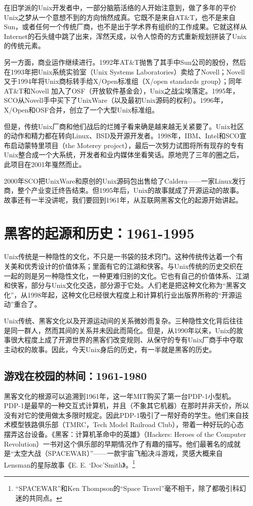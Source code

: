 \documentclass[12pt,oneside]{book}
\begin{document}
在旧学派的Unix开发者中，一部分脑筋活络的人开始注意到，做了多年的平价Unix之梦从一个意想不到的方向悄然成真。它既不是来自AT\&{}T，也不是来自Sun，或者任何一个传统厂商，也不是出于学术界有组织的工作成果。它就这样从Internet的石头缝中跳了出来，浑然天成，以令人惊奇的方式重新规划拼装了Unix的传统元素。

另一方面，商业运作继续进行。1992年AT\&{}T抛售了其手中Sun公司的股份，然后在1993年把Unix系统实验室（Unix Systems Laboratories）卖给了Novell；Novell又于1994年将Unix商标转手给X/Open标准组（X/open standards group）；同年AT\&{}T和Novell
加入了OSF（开放软件基金会），Unix之战尘埃落定。1995年，SCO从Novell手中买下了UnixWare（以及最初Unix源码的权利）。1996年，X/Open和OSF合并，创立了一个大型Unix标准组。

但是，传统Unix厂商和他们战后的烂摊子看来确是越来越无关紧要了。Unix社区的动作和精力都在转向Linux、BSD及开源开发者。1998年，IBM、Intel和SCO宣布启动蒙特里项目（the Moterey project），最后一次努力试图将所有现存的专有Unix整合成一个大系统，开发者和业内媒体坐看笑话。原地兜了三年的圈之后，此项目在2001年戛然而止。

2000年SCO把UnixWare和原创的Unix源码包出售给了Caldera——一家Linux发行商，整个产业变迁终告结束。但1995年后，Unix的故事就成了开源运动的故事。故事还有一半没讲呢，我们要回到1961年，从互联网黑客文化的起源开始讲起。

\section{黑客的起源和历史：1961-1995}
Unix传统是一种隐性的文化，不只是一书袋的技术窍门。这种传统传达着一个有关美和优秀设计的价值体系；里面有它的江湖和侠客。与Unix传统的历史交织在一起的则是另一种隐性文化，一种更难归别的文化。它也有自己的价值体系、江湖和侠客，部分与Unix文化交迭，部分源于它处。人们老是把这种文化称为“黑客文化”，从1998年起，这种文化已经很大程度上和计算机行业出版界所称的“开源运动”重合了。

Unix传统、黑客文化以及开源运动间的关系微妙而复杂。三种隐性文化背后往往是同一群人，然而其间的关系并未因此而简化。但是，从1990年以来，Unix的故事很大程度上成了开源世界的黑客们改变规则、从保守的专有Unix厂商手中夺取主动权的故事。因此，今天Unix身后的历史，有一半就是黑客的历史。


\subsection{游戏在校园的林间：1961-1980}
黑客文化的根源可以追溯到1961年，这一年MIT购买了第一台PDP-1小型机。PDP-1是最早的一种交互式计算机，并且（不象其它机器）在那时并非天价，所以没有对它的使用做太多限时规定。因此PDP-1吸引了一帮好奇的学生。他们来自技术模型铁路俱乐部（TMRC，Tech Model Railroad Club），带着一种好玩的心态摆弄这台设备。《黑客：计算机革命中的英雄》（Hackers:  Heroes of the Computer Revolution）\cite{Levy}一书对这个俱乐部的早期情况作了有趣的描写。他们最著名的成就是“太空大战（SPACEWAR）”——一款宇宙飞船决斗游戏，灵感大概来自Lensman的星际故事《E. E. ‘Doc’Smith》。\footnote{“SPACEWAR”和Ken Thompson的“Space Travel”毫不相干，除了都吸引科幻迷的共同点。}
\end{document}
